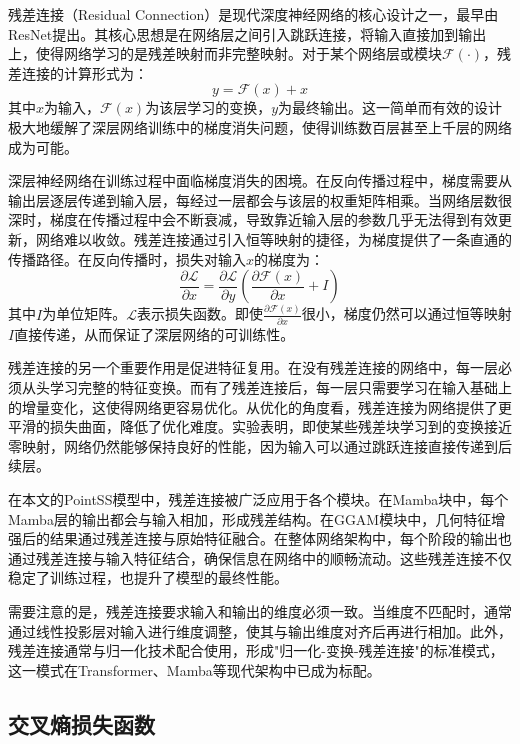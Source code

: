 \documentclass[12pt,a4paper,openany,oneside]{ctexbook}
\theoremstyle{definition}
\theoremstyle{remark}
\begin{document}
残差连接（Residual Connection）是现代深度神经网络的核心设计之一，最早由ResNet\cite{he2016deep}提出。其核心思想是在网络层之间引入跳跃连接，将输入直接加到输出上，使得网络学习的是残差映射而非完整映射。对于某个网络层或模块$\mathcal{F}(\cdot)$，残差连接的计算形式为：
\begin{equation}
y = \mathcal{F}(x) + x
\end{equation}
其中$x$为输入，$\mathcal{F}(x)$为该层学习的变换，$y$为最终输出。这一简单而有效的设计极大地缓解了深层网络训练中的梯度消失问题，使得训练数百层甚至上千层的网络成为可能。

深层神经网络在训练过程中面临梯度消失的困境。在反向传播过程中，梯度需要从输出层逐层传递到输入层，每经过一层都会与该层的权重矩阵相乘。当网络层数很深时，梯度在传播过程中会不断衰减，导致靠近输入层的参数几乎无法得到有效更新，网络难以收敛。残差连接通过引入恒等映射的捷径，为梯度提供了一条直通的传播路径。在反向传播时，损失对输入$x$的梯度为：
\begin{equation}
\frac{\partial \mathcal{L}}{\partial x} = \frac{\partial \mathcal{L}}{\partial y} \left(\frac{\partial \mathcal{F}(x)}{\partial x} + I\right)
\end{equation}
其中$I$为单位矩阵。$\mathcal{L}$表示损失函数。即使$\frac{\partial \mathcal{F}(x)}{\partial x}$很小，梯度仍然可以通过恒等映射$I$直接传递，从而保证了深层网络的可训练性。

残差连接的另一个重要作用是促进特征复用。在没有残差连接的网络中，每一层必须从头学习完整的特征变换。而有了残差连接后，每一层只需要学习在输入基础上的增量变化，这使得网络更容易优化。从优化的角度看，残差连接为网络提供了更平滑的损失曲面，降低了优化难度。实验表明，即使某些残差块学习到的变换接近零映射，网络仍然能够保持良好的性能，因为输入可以通过跳跃连接直接传递到后续层。

在本文的PointSS模型中，残差连接被广泛应用于各个模块。在Mamba块中，每个Mamba层的输出都会与输入相加，形成残差结构。在GGAM模块中，几何特征增强后的结果通过残差连接与原始特征融合。在整体网络架构中，每个阶段的输出也通过残差连接与输入特征结合，确保信息在网络中的顺畅流动。这些残差连接不仅稳定了训练过程，也提升了模型的最终性能。

需要注意的是，残差连接要求输入和输出的维度必须一致。当维度不匹配时，通常通过线性投影层对输入进行维度调整，使其与输出维度对齐后再进行相加。此外，残差连接通常与归一化技术配合使用，形成"归一化-变换-残差连接"的标准模式，这一模式在Transformer、Mamba等现代架构中已成为标配。

\subsection{交叉熵损失函数}
\end{document}
